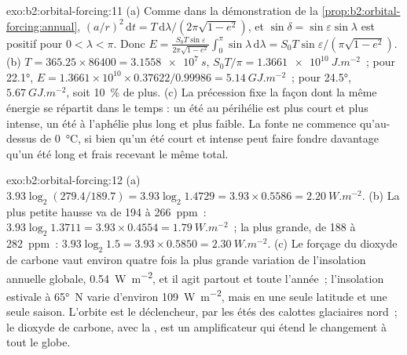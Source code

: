 \begin{solution}{exo:b2:orbital-forcing:11}
(a) Comme dans la démonstration de la \cref{prop:b2:orbital-forcing:annual}, $(a/r)^2\,\mathrm dt =
T\,\mathrm d\lambda/(2\pi\sqrt{1 - e^2})$, et $\sin\delta = \sin\varepsilon\sin\lambda$ est positif
pour $0 < \lambda < \pi$. Donc $E = \frac{S_0T\sin\varepsilon}{2\pi\sqrt{1 - e^2}}\int_0^{\pi}\sin\lambda
\,\mathrm d\lambda = S_0T\sin\varepsilon/(\pi\sqrt{1 - e^2})$. (b) $T = 365.25 \times 86400 =
\qty{3.1558e7}{s}$, $S_0T/\pi = \qty{1.3661e10}{J.m^{-2}}$~; pour \ang{22.1}, $E = 1.3661 \times 10^{10}
\times 0.37622/0.99986 = \qty{5.14}{GJ.m^{-2}}$~; pour \ang{24.5}, $\qty{5.67}{GJ.m^{-2}}$,
soit \qty{10}{\percent} de plus. (c) La précession fixe la façon dont la même énergie se répartit dans le temps : un été
au périhélie est plus court et plus intense, un été à l'aphélie plus long et plus faible. La fonte ne commence
qu'au-dessus de \qty{0}{\celsius}, si bien qu'un été court et intense peut faire fondre davantage qu'un été long et frais
recevant le même total.
\end{solution}

\begin{solution}{exo:b2:orbital-forcing:12}
(a) $3.93\log_2(279.4/189.7) = 3.93\log_2 1.4729 = 3.93 \times 0.5586 = \qty{2.20}{W.m^{-2}}$. (b) La
plus petite hausse va de 194 à \qty{266}{ppm}~: $3.93\log_2 1.3711 = 3.93 \times 0.4554 =
\qty{1.79}{W.m^{-2}}$~; la plus grande, de 188 à \qty{282}{ppm}~: $3.93\log_2 1.5 = 3.93 \times 0.5850 =
\qty{2.30}{W.m^{-2}}$. (c) Le forçage du dioxyde de carbone vaut environ quatre fois la plus grande variation de
l'insolation annuelle globale, \qty{0.54}{W.m^{-2}}, et il agit partout et toute l'année~; l'insolation estivale à \ang{65}~N
varie d'environ \qty{109}{W.m^{-2}}, mais en une seule latitude et une seule saison. L'orbite est le déclencheur,
par les étés des calottes glaciaires nord~; le dioxyde de carbone, avec la , est un amplificateur
qui étend le changement à tout le globe.
\end{solution}

